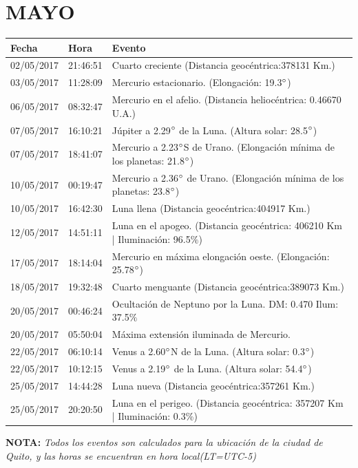 \documentclass[12pt,a4paper,oneside]{article}
\begin{document}
\section{MAYO}
\begin{center}
\begin{tabular}{ |l| l| l| }
\hline
 \textbf{Fecha} & \textbf{Hora} & \textbf{Evento}\\
 \hline
 02/05/2017& 21:46:51 &	Cuarto creciente (Distancia geocéntrica:378131 Km.)	\\
03/05/2017& 11:28:09 &	Mercurio estacionario. (Elongación: 19.3$\degree $)	\\
06/05/2017& 08:32:47 &	Mercurio en el afelio. (Distancia heliocéntrica: 0.46670 U.A.)	\\
07/05/2017& 16:10:21 &	Júpiter a 2.29$\degree $ de la Luna. (Altura solar: 28.5$\degree $)	\\
07/05/2017& 18:41:07 &	Mercurio a 2.23$\degree $S de Urano. (Elongación mínima de los planetas: 21.8$\degree $)	\\
10/05/2017& 00:19:47 &	Mercurio a 2.36$\degree $ de Urano. (Elongación mínima de los planetas: 23.8$\degree $)	\\
10/05/2017& 16:42:30 &	Luna llena (Distancia geocéntrica:404917 Km.)	\\
12/05/2017& 14:51:11 &	Luna en el apogeo. (Distancia geocéntrica: 406210 Km | Iluminación: 96.5$\%$)	\\
17/05/2017& 18:14:04 &	Mercurio en máxima elongación oeste. (Elongación: 25.78$\degree $)	\\
18/05/2017& 19:32:48 &	Cuarto menguante (Distancia geocéntrica:389073 Km.)	\\
20/05/2017& 00:46:24 &	Ocultación de Neptuno por la Luna. DM: 0.470 Ilum: 37.5$\%$	\\
20/05/2017& 05:50:04 &	Máxima extensión iluminada de Mercurio.	\\
22/05/2017& 06:10:14 &	Venus a 2.60$\degree $N de la Luna. (Altura solar: 0.3$\degree $)	\\
22/05/2017& 10:12:15 &	Venus a 2.19$\degree $ de la Luna. (Altura solar: 54.4$\degree $)	\\
25/05/2017& 14:44:28 &	Luna nueva (Distancia geocéntrica:357261 Km.)	\\
25/05/2017& 20:20:50 &	Luna en el perigeo. (Distancia geocéntrica: 357207 Km | Iluminación: 0.3\%)	\\
\hline
\end{tabular}
\end{center}
\vspace{1cm}
\textbf{NOTA:  }\textit{Todos los eventos son calculados para la ubicaci\'on de la ciudad de Quito, y las horas se encuentran en hora local(LT=UTC-5)}
\vspace{0.7cm}
\newpage
\end{document}
